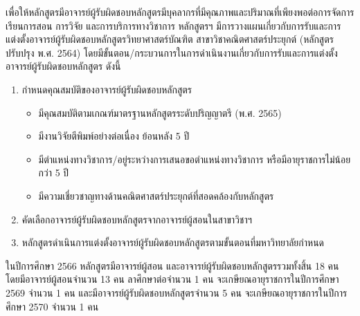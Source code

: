 \newpage
{}

เพื่อให้หลักสูตรมีอาจารย์ผู้รับผิดชอบหลักสูตรมีบุคลากรที่มีคุณภาพและปริมาณที่เพียงพอต่อการจัดการเรียนการสอน การวิจัย และการบริการทางวิชาการ หลักสูตรฯ มีการวางแผนเกี่ยวกับการรับและการแต่งตั้งอาจารย์ผู้รับผิดชอบหลักสูตรวิทยาศาสตร์บัณฑิต สาขาวิชาคณิตศาสตร์ประยุกต์ (หลักสูตรปรับปรุง พ.ศ. 2564) โดยมีขั้นตอน/กระบวนการในการดำเนินงานเกี่ยวกับการรับและการแต่งตั้งอาจารย์ผู้รับผิดชอบหลักสูตร ดังนี้
\begin{enumerate} 
\item กำหนดคุณสมบัติของอาจารย์ผู้รับผิดชอบหลักสูตร 
\begin{itemize} 
\item มีคุณสมบัติตามเกณฑ์มาตรฐานหลักสูตรระดับปริญญาตรี (พ.ศ. 2565)   
\item มีงานวิจัยตีพิมพ์อย่างต่อเนื่อง ย้อนหลัง 5 ปี 
\item มีตำแหน่งทางวิชาการ/อยู่ระหว่างการเสนอขอตำแหน่งทางวิชาการ หรือมีอายุราชการไม่น้อยกว่า 5 ปี  
\item มีความเชี่ยวชาญทางด้านคณิตศาสตร์ประยุกต์ที่สอดคล้องกับหลักสูตร 
\end{itemize} 
\item คัดเลือกอาจารย์ผู้รับผิดชอบหลักสูตรจากอาจารย์ผู้สอนในสาขาวิชาฯ 
\item หลักสูตรดำเนินการแต่งตั้งอาจารย์ผู้รับผิดชอบหลักสูตรตามขั้นตอนที่มหาวิทยาลัยกำหนด 
\end{enumerate}

 ในปีการศึกษา 2566 หลักสูตรมีอาจารย์ผู้สอน และอาจารย์ผู้รับผิดชอบหลักสูตรรวมทั้งสิ้น 18 คน โดยมีอาจารย์ผู้สอนจำนวน 13 คน ลาศึกษาต่อจำนวน 1 คน จะเกษียณอายุราชการในปีการศึกษา 2569 จำนวน 1 คน และมีอาจารย์ผู้รับผิดชอบหลักสูตรจำนวน 5 คน จะเกษียณอายุราชการในปีการศึกษา 2570 จำนวน 1 คน 
 
